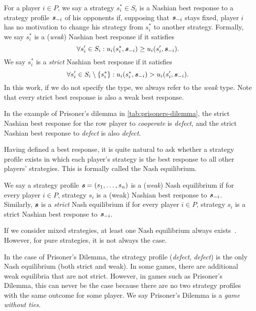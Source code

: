 \begin{definition}
  For a player $i \in P$, we say a strategy $s_i^* \in S_i$ is a Nashian best response to a strategy profile $\boldsymbol{\mathit{s}}_{-i}$ of his opponents if, supposing that $\boldsymbol{\mathit{s}}_{-i}$ stays fixed, player $i$ has no motivation to change his strategy from $s_i^*$ to another strategy.
  Formally, we say $s_i^*$ is a (\textit{weak}) Nashian best response if it satisfies
  \[
    \forall s_i' \in S_i: u_i(s_i^*, \boldsymbol{\mathit{s}}_{-i}) \ge u_i(s_i', \boldsymbol{\mathit{s}}_{-i}).
  \]
  We say $s_i^*$ is a \textit{strict} Nashian best response if it satisfies
  \[
    \forall s_i' \in S_i \setminus \{s_i^*\}: u_i(s_i^*, \boldsymbol{\mathit{s}}_{-i}) > u_i(s_i', \boldsymbol{\mathit{s}}_{-i}).
  \]
  In this work, if we do not specify the type, we always refer to the \textit{weak} type.
  Note that every strict best response is also a weak best response.
\end{definition}

In the example of Prisoner's dilemma in \autoref{tab:prisoners-dilemma}, the strict Nashian best response for the row player to \textit{cooperate} is \textit{defect}, and the strict Nashian best response to \textit{defect} is also \textit{defect}.

Having defined a best response,  it is quite natural to ask whether a strategy profile exists in which each player's strategy is the best response to all other players' strategies.
This is formally called the Nash equilibrium.

\begin{definition}
  We say a strategy profile $\boldsymbol{\mathit{s}} = (s_1, \dots, s_n)$ is a (\textit{weak}) Nash equilibrium if for every player $i \in P$, strategy $s_i$ is a (weak) Nashian best response to $\boldsymbol{\mathit{s}}_{-i}$.
  Similarly, $\boldsymbol{\mathit{s}}$ is a \textit{strict} Nash equilibrium if for every player $i \in P$, strategy $s_i$ is a strict Nashian best response to $\boldsymbol{\mathit{s}}_{-i}$.
\end{definition}

If we consider mixed strategies, at least one Nash equilibrium always exists~\cite{Nash51}.
However, for pure strategies, it is not always the case.

In the case of Prisoner's Dilemma, the strategy profile (\textit{defect}, \textit{defect}) is the only Nash equilibrium (both strict and weak).
In some games, there are additional weak equilibria that are not strict.
However, in games such as Prisoner's Dilemma, this can never be the case because there are no two strategy profiles with the same outcome for some player.
We say Prisoner's Dilemma is a \textit{game without ties}.

